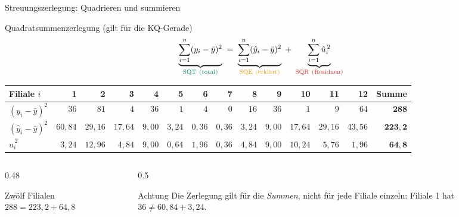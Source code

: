 \documentclass[aspectratio=169,11pt]{beamer}
\begin{document}
\begin{frame}{Streuungszerlegung: Quadrieren und summieren}
  \begin{block}{Quadratsummenzerlegung (gilt für die KQ-Gerade)}
    \vspace{-1pt}
    \[
      \underbrace{\sum_{i=1}^{n} (y_i - \bar{y})^{2}}_{\color{hsbigreen}\text{SQT}\ \text{(total)}}
      \;=\;
      \underbrace{\sum_{i=1}^{n} (\hat{y}_i - \bar{y})^{2}}_{\color{hsbiaccent}\text{SQE}\ \text{(erklärt)}}
      \;+\;
      \underbrace{\sum_{i=1}^{n} \hat{u}_i^{\,2}}_{\color{resred}\text{SQR}\ \text{(Residuen)}}
    \]
  \end{block}

  \begin{center}
    \scriptsize
    \renewcommand{\arraystretch}{1.1}
    \setlength{\tabcolsep}{3.5pt}
    \begin{tabular}{l*{12}{r}r}
      \toprule
      Filiale $i$ & 1 & 2 & 3 & 4 & 5 & 6 & 7 & 8 & 9 & 10 & 11 & 12 & Summe \\
      \midrule
      {\color{hsbigreen}$(y_i - \bar{y})^{2}$}       & $36$ & $81$ & $4$ & $36$ & $1$ & $4$ & $0$ & $16$ & $36$ & $1$ & $9$ & $64$ & $\mathbf{288}$ \\
      {\color{hsbiaccent}$(\hat{y}_i - \bar{y})^{2}$} & $60{,}84$ & $29{,}16$ & $17{,}64$ & $9{,}00$ & $3{,}24$ & $0{,}36$ & $0{,}36$ & $3{,}24$ & $9{,}00$ & $17{,}64$ & $29{,}16$ & $43{,}56$ & $\mathbf{223{,}2}$ \\
      {\color{resred}$\hat{u}_i^{\,2}$}              & $3{,}24$ & $12{,}96$ & $4{,}84$ & $9{,}00$ & $0{,}64$ & $1{,}96$ & $0{,}36$ & $4{,}84$ & $9{,}00$ & $10{,}24$ & $5{,}76$ & $1{,}96$ & $\mathbf{64{,}8}$ \\
      \bottomrule
    \end{tabular}
  \end{center}

  \begin{columns}[T]
    \begin{column}{0.48\textwidth}
      \small
      \begin{exampleblock}{Zwölf Filialen}
        $288 = 223{,}2 + 64{,}8$ \quad\checkmark
      \end{exampleblock}
    \end{column}
    \begin{column}{0.5\textwidth}
      \small
      \begin{alertblock}{Achtung}
        Die Zerlegung gilt für die \emph{Summen}, nicht für jede Filiale
        einzeln: Filiale 1 hat $36 \ne 60{,}84 + 3{,}24$.
      \end{alertblock}
    \end{column}
  \end{columns}
\end{frame}
\end{document}
